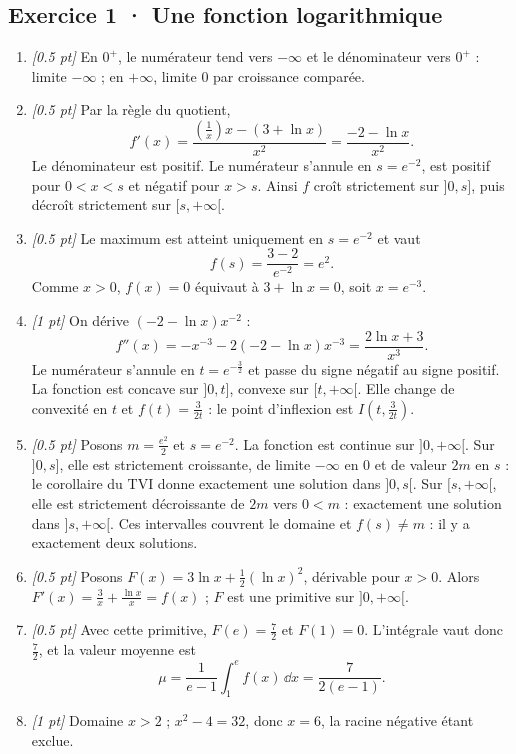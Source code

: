 \subsection*{Exercice 1 · Une fonction logarithmique}\begin{enumerate}

\item \textit{[\num{0,5} pt]} En $0^+$, le numérateur tend vers $-\infty$ et le dénominateur vers $0^+$ : limite $-\infty$ ; en $+\infty$, limite $0$ par croissance comparée.

\item \textit{[\num{0,5} pt]} Par la règle du quotient,
\[f'(x)=\frac{(\frac{1}{x})x-(3+\ln x)}{x^2}=\frac{-2-\ln x}{x^2}.\]
Le dénominateur est positif. Le numérateur s'annule en $s=e^{-2}$, est positif pour $0<x<s$ et négatif pour $x>s$. Ainsi $f$ croît strictement sur $]0,s]$, puis décroît strictement sur $[s,+\infty[$.

\item \textit{[\num{0,5} pt]} Le maximum est atteint uniquement en $s=e^{-2}$ et vaut
\[f(s)=\frac{3- 2}{e^{-2}}=e^{2}.\]
Comme $x>0$, $f(x)=0$ équivaut à $3+\ln x=0$, soit $x=e^{-3}$.

\item \textit{[1 pt]} On dérive $(-2-\ln x)x^{-2}$ :
\[f''(x)=-x^{-3}-2(-2-\ln x)x^{-3}=\frac{2\ln x+3}{x^3}.\]
Le numérateur s'annule en $t=e^{-\frac{3}{2}}$ et passe du signe négatif au signe positif. La fonction est concave sur $]0,t]$, convexe sur $[t,+\infty[$. Elle change de convexité en $t$ et $f(t)=\frac{3}{2t}$ : le point d'inflexion est $I(t,\frac{3}{2t})$.

\item \textit{[\num{0,5} pt]} Posons $m=\frac{e^{2}}{2}$ et $s=e^{-2}$. La fonction est continue sur $]0,+\infty[$. Sur $]0,s]$, elle est strictement croissante, de limite $-\infty$ en $0$ et de valeur $2m$ en $s$ : le corollaire du TVI donne exactement une solution dans $]0,s[$. Sur $[s,+\infty[$, elle est strictement décroissante de $2m$ vers $0<m$ : exactement une solution dans $]s,+\infty[$. Ces intervalles couvrent le domaine et $f(s)\ne m$ : il y a exactement deux solutions.

\item \textit{[\num{0,5} pt]} Posons $F(x)=3\ln x+\frac12(\ln x)^2$, dérivable pour $x>0$. Alors $F'(x)=\frac{3}{x}+\frac{\ln x}{x}=f(x)$ ; $F$ est une primitive sur $]0,+\infty[$.

\item \textit{[\num{0,5} pt]} Avec cette primitive, $F(e)=\frac{7}{2}$ et $F(1)=0$. L'intégrale vaut donc $\frac{7}{2}$, et la valeur moyenne est
\[\mu=\frac{1}{e-1}\int_1^e f(x)\,\dd x=\frac{7}{2(e-1)}.\]

\item \textit{[1 pt]} Domaine $x>2$ ; $x^2-4=32$, donc $x=6$, la racine négative étant exclue.

\end{enumerate}

